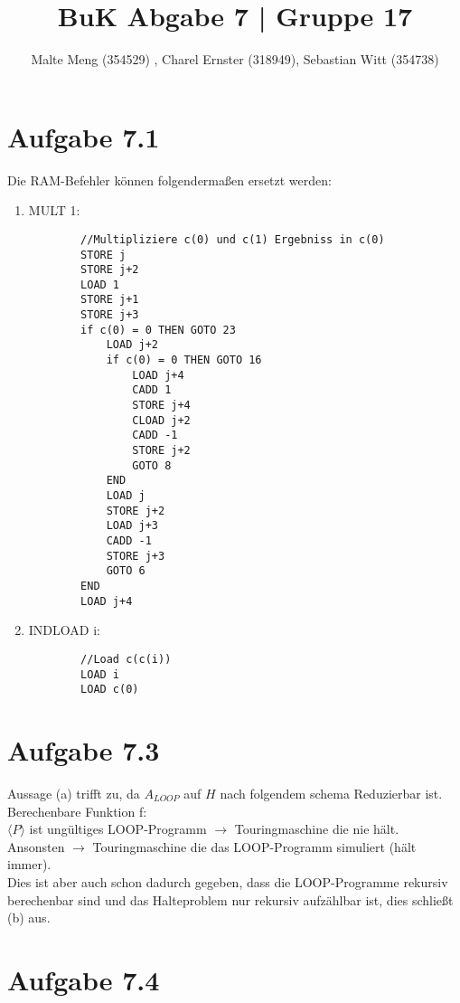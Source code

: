 \documentclass{article}
\title{BuK Abgabe 7 | Gruppe 17}
\author{Malte Meng (354529) , Charel Ernster (318949), Sebastian Witt (354738)}
\begin{document}
	\maketitle 
	\section[a 7.1]{Aufgabe 7.1}
	Die RAM-Befehler können folgendermaßen ersetzt werden:\\
	\begin{enumerate}[label=(\alph*).]
		\item MULT 1:\\
		\lstset{
			numbers=left,
			stepnumber=1,    
			firstnumber=0,
			numberfirstline=false
		}
		\begin{lstlisting}
		//Multipliziere c(0) und c(1) Ergebniss in c(0)
		STORE j
		STORE j+2
		LOAD 1
		STORE j+1
		STORE j+3
		if c(0) = 0 THEN GOTO 23
			LOAD j+2
			if c(0) = 0 THEN GOTO 16
				LOAD j+4
				CADD 1
				STORE j+4
				CLOAD j+2
				CADD -1
				STORE j+2
				GOTO 8
			END
			LOAD j
			STORE j+2
			LOAD j+3
			CADD -1
			STORE j+3
			GOTO 6
		END
		LOAD j+4
		\end{lstlisting}
		\item INDLOAD i:
		\begin{lstlisting}
		//Load c(c(i))
		LOAD i
		LOAD c(0)
		\end{lstlisting}
	\end{enumerate}
	\section[a 7.3]{Aufgabe 7.3}
	Aussage (a) trifft zu, da $A_{LOOP}$ auf $H$ nach folgendem schema Reduzierbar ist. \\
	Berechenbare Funktion f:\\
	$\langle P \rangle$ ist ungültiges LOOP-Programm $\rightarrow$ Touringmaschine die nie hält.\\
	Ansonsten $\rightarrow$ Touringmaschine die das LOOP-Programm simuliert (hält immer).\\
	Dies ist aber auch schon dadurch gegeben, dass die LOOP-Programme rekursiv berechenbar sind und das Halteproblem nur rekursiv aufzählbar ist, dies schließt (b) aus.
	\section[a 7.4]{Aufgabe 7.4}
	
\end{document}
